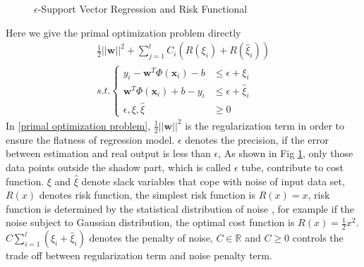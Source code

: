 \documentclass[12pt, draftclsnofoot, onecolumn]{IEEEtran}
\begin{document}
\begin{spacing}{2}
\begin{figure}
\centering
\def\svgwidth{\columnwidth}

\caption{$\epsilon$-Support Vector Regression and Risk Functional}
\label{epsilon-SVR}
\end{figure}

Here we give the primal optimization problem directly
\begin{eqnarray}
\nonumber
\frac{1}{2}||\mathbf{w}||^{2}+\sum_{j=1}^{l}C_{i}(R(\xi_{i})+R(\hat{\xi}_{i}))\\
s.t. \left\{\begin{array}{ll}
y_{i}-\mathbf{w}^{T}\Phi(\mathbf{x}_{i})-b &\leq \epsilon+\xi_{i}\\
\mathbf{w}^{T}\Phi(\mathbf{x}_{i})+b-y_{i} &\leq \epsilon+\hat{\xi}_{i}\\
\epsilon, \xi,\hat{\xi} &\geq 0
\end{array}\right.
\label{primal optimization problem}
\end{eqnarray}
In \ref{primal optimization problem}, $\frac{1}{2}||\mathbf{w}||^{2}$ is the regularization term in order to ensure the flatness of regression model. $\epsilon$ denotes the precision, if the error between estimation and real output is less than $\epsilon$, As shown in Fig \ref{epsilon-SVR}, only those data points outside the shadow part, which is called $\epsilon$ tube, contribute to cost function. $\xi$ and $\hat{\xi}$ denote slack variables that cope with noise of input data set, $R(x)$ denotes risk function, the simplest risk function is $R(x)=x$, risk function is determined by the statistical distribution of noise \cite{A tutorial of Support Vector Regression}, for example if the noise subject to Gaussian distribution, the optimal cost function is $R(x)=\frac{1}{2}x^{2}$. $C\sum_{i=1}^{l}(\xi_{i}+\hat{\xi}_{i})$ denotes the penalty of noise, $C\in \mathbb{R}$ and $C\geq 0$ controls the trade off between regularization term and noise penalty term.

\end{spacing}
\end{document}
